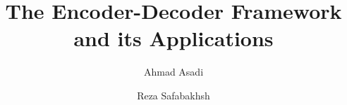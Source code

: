 \documentclass[preprint, 10pt]{elsarticle}
\begin{document}
	\begin{frontmatter}
		
		
		\author{Ahmad Asadi}
		\author{Reza Safabakhsh}
		\address{Department of Computer Engineering and Information Technology, Amirkabir University of Technology}
		
		\title{The Encoder-Decoder Framework and its Applications}
		
		
		\author{}
		
		\address{}
		
		\begin{abstract}


\end{abstract}
\end{frontmatter}
\end{document}
